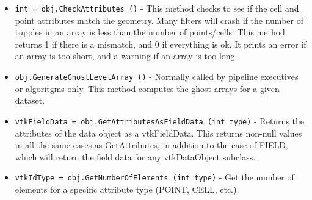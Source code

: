 \begin{itemize}
\item  \verb|int = obj.CheckAttributes ()| -  This method checks to see if the cell and point attributes
 match the geometry.  Many filters will crash if the number of
 tupples in an array is less than the number of points/cells.
 This method returns 1 if there is a mismatch,
 and 0 if everything is ok.  It prints an error if an
 array is too short, and a warning if an array is too long.

\item  \verb|obj.GenerateGhostLevelArray ()| -  Normally called by pipeline executives or algoritgms only. This method
 computes the ghost arrays for a given dataset.

\item  \verb|vtkFieldData = obj.GetAttributesAsFieldData (int type)| -  Returns the attributes of the data object as a vtkFieldData.
 This returns non-null values in all the same cases as GetAttributes,
 in addition to the case of FIELD, which will return the field data
 for any vtkDataObject subclass.

\item  \verb|vtkIdType = obj.GetNumberOfElements (int type)| -  Get the number of elements for a specific attribute type (POINT, CELL, etc.).

\end{itemize}
